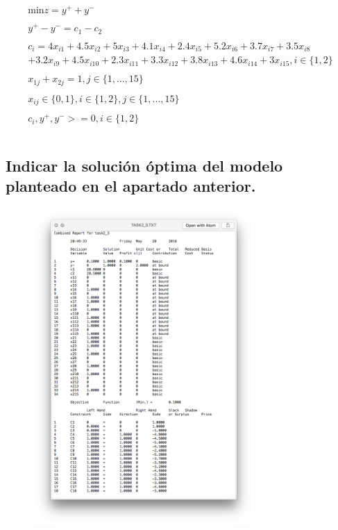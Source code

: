 \documentclass[10pt, a4paper]{article}
\begin{document}
			\[
				\begin{split}
					\text{min} z = y^{+} + y^{-} \\ \\
						y^{+} - y^{-} = c_1 - c_2 \\ \\
						c_i = 4x_{i1} + 4.5x_{i2} + 5x_{i3} + 4.1x_{i4} + 2.4x_{i5} + 5.2x_{i6} + 3.7x_{i7} + 3.5x_{i8} \\
						+ 3.2x_{i9} + 4.5x_{i10} + 2.3x_{i11} + 3.3x_{i12} + 3.8x_{i13} + 4.6x_{i14} + 3x_{i15}, i \in \{1,2\}\\ \\
						x_{1j} + x_{2j} = 1, j \in \{1,...,15\} \\ \\
						x_{ij} \in \{0,1\}, i \in \{1,2\},j \in \{1,...,15\} \\ \\
						c_{i}, y^{+}, y^{-} >= 0, i \in \{1,2\}\\ \\
				\end{split}
			\]
		\subsection{Indicar la solución óptima del modelo planteado en el apartado anterior.}

			\paragraph{}
			\begin{figure}[H]

			\centering
	            \includegraphics[width=0.75\textwidth]{res/exercise-3-result.png}
	        \end{figure}
\end{document}
